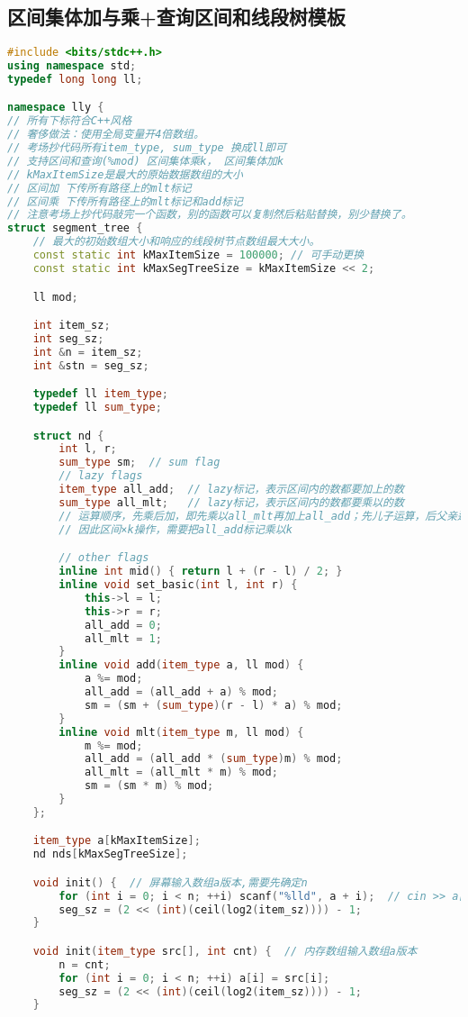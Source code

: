 \subsection{区间集体加与乘+查询区间和线段树模板}
\begin{lstlisting}[language={c++}]
#include <bits/stdc++.h>
using namespace std;
typedef long long ll;

namespace lly {
// 所有下标符合C++风格
// 奢侈做法：使用全局变量开4倍数组。
// 考场抄代码所有item_type, sum_type 换成ll即可
// 支持区间和查询(%mod) 区间集体乘k， 区间集体加k
// kMaxItemSize是最大的原始数据数组的大小
// 区间加 下传所有路径上的mlt标记
// 区间乘 下传所有路径上的mlt标记和add标记
// 注意考场上抄代码敲完一个函数，别的函数可以复制然后粘贴替换，别少替换了。
struct segment_tree {
	// 最大的初始数组大小和响应的线段树节点数组最大大小。
	const static int kMaxItemSize = 100000; // 可手动更换
	const static int kMaxSegTreeSize = kMaxItemSize << 2;

	ll mod;

	int item_sz;
	int seg_sz;
	int &n = item_sz;
	int &stn = seg_sz;

	typedef ll item_type;
	typedef ll sum_type;

	struct nd {
		int l, r;
		sum_type sm;  // sum flag
		// lazy flags
		item_type all_add;  // lazy标记，表示区间内的数都要加上的数
		sum_type all_mlt;   // lazy标记，表示区间内的数都要乘以的数
		// 运算顺序，先乘后加，即先乘以all_mlt再加上all_add；先儿子运算，后父亲运算。
		// 因此区间×k操作，需要把all_add标记乘以k

		// other flags
		inline int mid() { return l + (r - l) / 2; }
		inline void set_basic(int l, int r) {
			this->l = l;
			this->r = r;
			all_add = 0;
			all_mlt = 1;
		}
		inline void add(item_type a, ll mod) {
			a %= mod;
			all_add = (all_add + a) % mod;
			sm = (sm + (sum_type)(r - l) * a) % mod;
		}
		inline void mlt(item_type m, ll mod) {
			m %= mod;
			all_add = (all_add * (sum_type)m) % mod;
			all_mlt = (all_mlt * m) % mod;
			sm = (sm * m) % mod;
		}
	};

	item_type a[kMaxItemSize];
	nd nds[kMaxSegTreeSize];

	void init() {  // 屏幕输入数组a版本,需要先确定n
		for (int i = 0; i < n; ++i) scanf("%lld", a + i);  // cin >> a[i];
		seg_sz = (2 << (int)(ceil(log2(item_sz)))) - 1;
	}

	void init(item_type src[], int cnt) {  // 内存数组输入数组a版本
		n = cnt;
		for (int i = 0; i < n; ++i) a[i] = src[i];
		seg_sz = (2 << (int)(ceil(log2(item_sz)))) - 1;
	}


\end{lstlisting}

